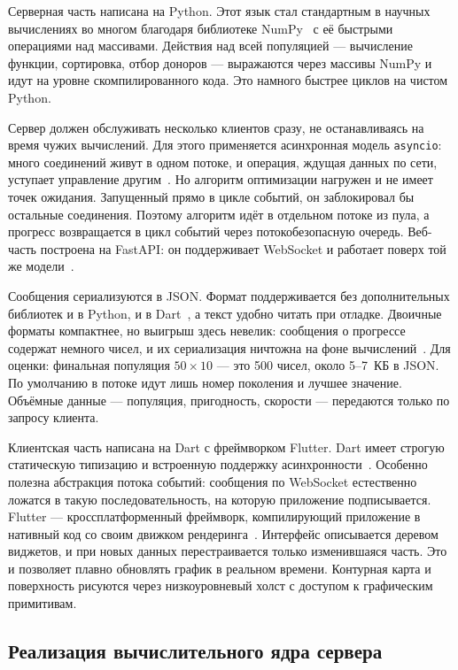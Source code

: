 \documentclass[14pt, a4paper]{extarticle}
\begin{document}
Серверная часть написана на Python. Этот язык стал стандартным в научных
вычислениях во многом благодаря библиотеке NumPy~\cite{numpy2020} с её быстрыми
операциями над массивами. Действия над всей популяцией --- вычисление функции,
сортировка, отбор доноров --- выражаются через массивы NumPy и идут на уровне
скомпилированного кода. Это намного быстрее циклов на чистом Python.

Сервер должен обслуживать несколько клиентов сразу, не останавливаясь на время
чужих вычислений. Для этого применяется асинхронная модель \texttt{asyncio}: много
соединений живут в одном потоке, и операция, ждущая данных по сети, уступает
управление другим~\cite{yavorski2024}. Но алгоритм оптимизации нагружен и не имеет
точек ожидания. Запущенный прямо в цикле событий, он заблокировал бы остальные
соединения. Поэтому алгоритм идёт в отдельном потоке из пула, а прогресс
возвращается в цикл событий через потокобезопасную очередь. Веб-часть построена на
FastAPI: он поддерживает WebSocket и работает поверх той же модели~\cite{fastapi_docs}.

Сообщения сериализуются в JSON. Формат поддерживается без дополнительных библиотек
и в Python, и в Dart~\cite{pythonjson, dartconvert}, а текст удобно читать при
отладке. Двоичные форматы компактнее, но выигрыш здесь невелик: сообщения о
прогрессе содержат немного чисел, и их сериализация ничтожна на фоне
вычислений~\cite{shulman2021}. Для оценки: финальная популяция $50 \times 10$ ---
это 500 чисел, около 5--7~КБ в JSON. По умолчанию в потоке идут лишь номер
поколения и лучшее значение. Объёмные данные --- популяция, пригодность, скорости
--- передаются только по запросу клиента.

Клиентская часть написана на Dart с фреймворком Flutter. Dart имеет строгую
статическую типизацию и встроенную поддержку асинхронности~\cite{ryabokon2013}.
Особенно полезна абстракция потока событий: сообщения по WebSocket естественно
ложатся в такую последовательность, на которую приложение подписывается. Flutter
--- кроссплатформенный фреймворк, компилирующий приложение в нативный код со своим
движком рендеринга~\cite{kamyshev2020}. Интерфейс описывается деревом виджетов, и
при новых данных перестраивается только изменившаяся часть. Это и позволяет плавно
обновлять график в реальном времени. Контурная карта и поверхность рисуются через
низкоуровневый холст с доступом к графическим примитивам.

\subsection{Реализация вычислительного ядра сервера}
\label{subsec:core}
\end{document}
